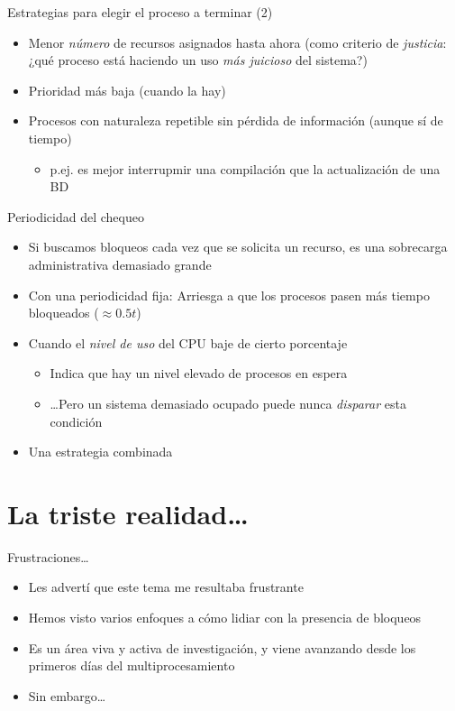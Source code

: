 \documentclass[presentation]{beamer}
\begin{document}
\begin{frame}[label={sec:org3df7048}]{Estrategias para elegir el proceso a terminar (2)}
\begin{itemize}
\item Menor \emph{número} de recursos asignados hasta ahora (como criterio
de \emph{justicia}: ¿qué proceso está haciendo un uso \emph{más juicioso}
del sistema?)
\item Prioridad más baja (cuando la hay)
\item Procesos con naturaleza repetible sin pérdida de información
(aunque sí de tiempo)
\begin{itemize}
\item p.ej. es mejor interrupmir una compilación que la actualización
de una BD
\end{itemize}
\end{itemize}
\end{frame}

\begin{frame}[label={sec:org21af596}]{Periodicidad del chequeo}
\begin{itemize}
\item Si buscamos bloqueos cada vez que se solicita un recurso, es una
sobrecarga administrativa demasiado grande
\item Con una periodicidad fija: Arriesga a que los procesos pasen más
tiempo bloqueados (\(\approx0.5t\))
\item Cuando el \emph{nivel de uso} del CPU baje de cierto porcentaje
\begin{itemize}
\item Indica que hay un nivel elevado de procesos en espera
\item \ldots{}Pero un sistema demasiado ocupado puede nunca \emph{disparar} esta condición
\end{itemize}
\item Una estrategia combinada
\end{itemize}
\end{frame}

\section{La triste realidad\ldots{}}
\label{sec:org64ae0a6}

\begin{frame}[label={sec:org4a75379}]{Frustraciones\ldots{}}
\begin{itemize}
\item Les advertí que este tema me resultaba frustrante
\item Hemos visto varios enfoques a cómo lidiar con la presencia de
bloqueos
\item Es un área viva y activa de investigación, y viene avanzando desde
los primeros días del multiprocesamiento
\item Sin embargo\ldots{}
\end{itemize}
\end{frame}
\end{document}
